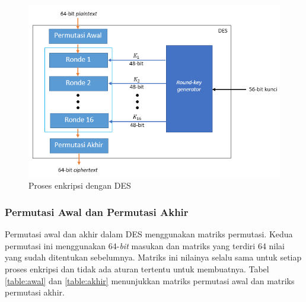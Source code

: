 \begin{figure}[H]
\includegraphics[scale=0.6]{Gambar/DES}%
\centering
\caption{Proses enkripsi dengan DES}\label{fig:enkripsides}
\end{figure}

\subsubsection{Permutasi Awal dan Permutasi Akhir}
Permutasi awal dan akhir dalam DES menggunakan matriks permutasi. Kedua permutasi ini menggunakan 64-\textit{bit} masukan dan matriks yang terdiri 64 nilai yang sudah ditentukan sebelumnya. Matriks ini nilainya selalu sama untuk setiap proses enkripsi dan tidak ada aturan tertentu untuk membuatnya. Tabel \ref{table:awal} dan \ref{table:akhir} menunjukkan matriks permutasi awal dan matriks permutasi akhir.


